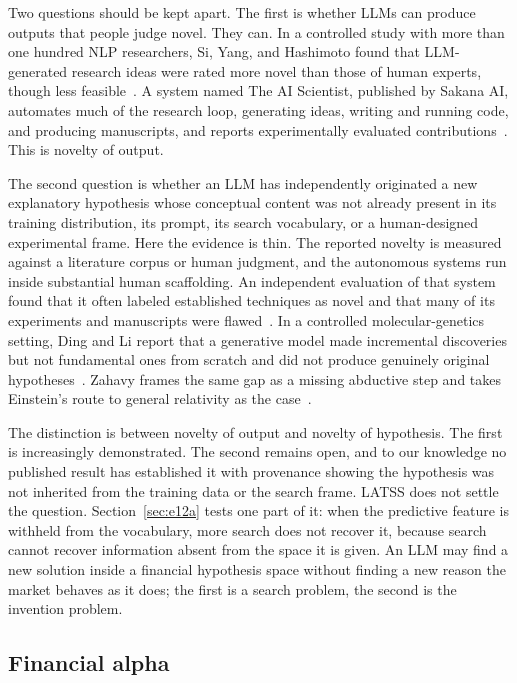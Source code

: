 \documentclass[11pt]{article}
\begin{document}
Two questions should be kept apart. The first is whether LLMs can produce outputs that people judge
novel. They can. In a controlled study with more than one hundred NLP researchers, Si, Yang, and
Hashimoto found that LLM-generated research ideas were rated more novel than those of human experts,
though less feasible~\cite{si2024}. A system named The AI Scientist, published by Sakana AI, automates
much of the research loop, generating ideas, writing and running code, and producing manuscripts, and
reports experimentally evaluated contributions~\cite{aiscientist}. This is novelty of output.

The second question is whether an LLM has independently originated a new explanatory hypothesis whose
conceptual content was not already present in its training distribution, its prompt, its search
vocabulary, or a human-designed experimental frame. Here the evidence is thin. The reported novelty is
measured against a literature corpus or human judgment, and the autonomous systems run inside
substantial human scaffolding. An independent evaluation of that system found that it often
labeled established techniques as novel and that many of its experiments and manuscripts were
flawed~\cite{aiscientisteval}. In a controlled molecular-genetics setting, Ding and Li report that a
generative model made incremental discoveries but not fundamental ones from scratch and did not
produce genuinely original hypotheses~\cite{dingli}. Zahavy frames the same gap as a missing abductive
step and takes Einstein's route to general relativity as the case~\cite{zahavy}.

The distinction is between novelty of output and novelty of hypothesis. The first is increasingly
demonstrated. The second remains open, and to our knowledge no published result has established it
with provenance showing the hypothesis was not inherited from the training data or the search frame.
LATSS does not settle the question. Section~\ref{sec:e12a} tests one part of it: when the predictive
feature is withheld from the vocabulary, more search does not recover it, because search cannot
recover information absent from the space it is given. An LLM may find a new solution inside a
financial hypothesis space without finding a new reason the market behaves as it does; the first is a
search problem, the second is the invention problem.

\subsection{Financial alpha}
\end{document}
